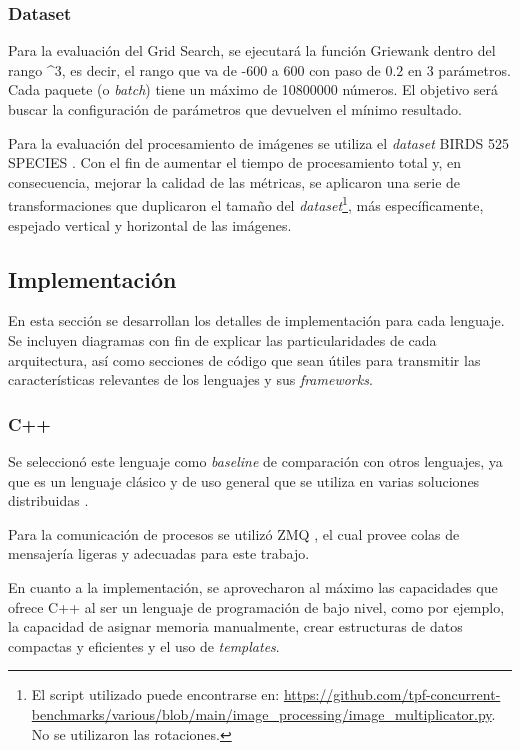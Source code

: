\documentclass[11pt]{article}
\let\Oldsubsection\subsection
\renewcommand{\subsection}{\FloatBarrier\Oldsubsection}
\let\Oldsubsubsection\subsubsection
\renewcommand{\subsubsection}{\FloatBarrier\Oldsubsubsection}
\newcommand{\english}[1]{\textit{#1}}
\begin{document}
\subsubsection{Dataset}

Para la evaluación del Grid Search, se ejecutará la función Griewank \cite{sis_dist:griewank} dentro del rango \break
[-600; 600; $0.2$]\^{}3, es decir, el rango que va de -600 a 600 con paso de $0.2$ en 3 parámetros. Cada paquete (o \english{batch}) tiene un máximo de 10800000 números. El objetivo será buscar la configuración de parámetros que devuelven el mínimo resultado.

Para la evaluación del procesamiento de imágenes se utiliza el \english{dataset} BIRDS 525 SPECIES \cite{sis_dist:birds_dataset}. Con el fin de aumentar el tiempo de procesamiento total y, en consecuencia, mejorar la calidad de las métricas, se aplicaron una serie de transformaciones que duplicaron el tamaño del \english{dataset}\footnote{El script utilizado puede encontrarse en: \url{https://github.com/tpf-concurrent-benchmarks/various/blob/main/image_processing/image_multiplicator.py}. No se utilizaron las rotaciones.}, más específicamente, espejado vertical y horizontal de las imágenes.

\newpage

\subsection{Implementación}

En esta sección se desarrollan los detalles de implementación para cada lenguaje. Se incluyen diagramas con fin de explicar las particularidades de cada arquitectura, así como secciones de código que sean útiles para transmitir las características relevantes de los lenguajes y sus \english{frameworks}.

\subsubsection{C++}

Se seleccionó este lenguaje como \english{baseline} de comparación con otros lenguajes, ya que es un lenguaje clásico y de uso general que se utiliza en varias soluciones distribuidas \cite{cpp:ex:ray-io} \cite{cpp:ex:red-panda}.

Para la comunicación de procesos se utilizó ZMQ \cite{cpp:lib:zmq}, el cual provee colas de mensajería ligeras y adecuadas para este trabajo.

En cuanto a la implementación, se aprovecharon al máximo las capacidades que ofrece C++ al ser un lenguaje de programación de bajo nivel, como por ejemplo, la capacidad de asignar memoria manualmente, crear estructuras de datos compactas y eficientes y el uso de \english{templates}.
\end{document}
